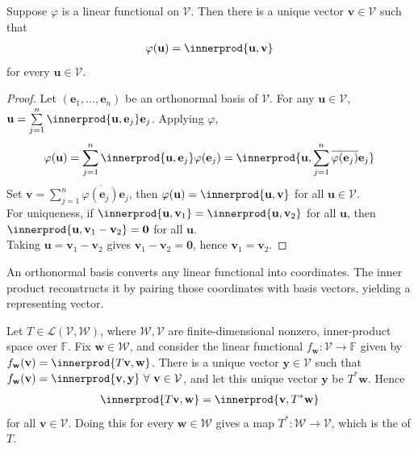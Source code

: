 \begin{theorem} Suppose $\varphi$ is a linear functional on $\mathcal{V}$. Then there is a unique vector $\mathbf{v} \in \mathcal{V}$ such that
\begin{align}
\varphi(\mathbf{u}) = \innerprod{\mathbf{u}, \mathbf{v}} \nonumber
\end{align}
for every $\mathbf{u} \in \mathcal{V}$.
\begin{proof} Let $(\mathbf{e}_1, \ldots, \mathbf{e}_n)$ be an orthonormal basis of $\mathcal{V}$. For any $\mathbf{u} \in \mathcal{V}$, $\mathbf{u} = \sum\limits_{j=1}^n \innerprod{\mathbf{u}, \mathbf{e}_j} \mathbf{e}_j$. Applying $\varphi$,
\begin{align}
\varphi(\mathbf{u}) = \sum\limits_{j=1}^n \innerprod{\mathbf{u}, \mathbf{e}_j} \varphi(\mathbf{e}_j) = \innerprod{\mathbf{u}, \sum\limits_{j=1}^n \overline{\varphi(\mathbf{e}_j)}\mathbf{e}_j} \nonumber
\end{align}
Set $\mathbf{v} = \sum\limits_{j=1}^n \overline{\varphi(\mathbf{e}_j)}\mathbf{e}_j$, then $\varphi(\mathbf{u}) = \innerprod{\mathbf{u}, \mathbf{v}}$ for all $\mathbf{u} \in \mathcal{V}$.\\
For uniqueness, if $\innerprod{\mathbf{u}, \mathbf{v}_1} = \innerprod{\mathbf{u}, \mathbf{v}_2}$ for all $\mathbf{u}$, then $\innerprod{\mathbf{u}, \mathbf{v}_1 - \mathbf{v}_2} = \mathbf{0}$ for all $\mathbf{u}$.\\
Taking $\mathbf{u} = \mathbf{v}_1 - \mathbf{v}_2$ gives $\mathbf{v}_1 - \mathbf{v}_2 = \mathbf{0}$, hence $\mathbf{v}_1 = \mathbf{v}_2$.
\end{proof}
\end{theorem}

An orthonormal basis converts any linear functional into coordinates. The inner product reconstructs it by pairing those coordinates with basis vectors, yielding a representing vector.

\begin{definition} Let $T \in \mathcal{L}(\mathcal{V}, \mathcal{W})$, where $\mathcal{W}, \mathcal{V}$ are finite-dimensional nonzero, inner-product space over $\mathbb{F}$. Fix $\mathbf{w} \in \mathcal{W}$, and consider the linear functional $f_{\mathbf{w}}: \mathcal{V} \rightarrow \mathbb{F}$ given by $f_{\mathbf{w}}(\mathbf{v}) = \innerprod{T\mathbf{v}, \mathbf{w}}$. There is a unique vector $\mathbf{y} \in \mathcal{V}$ such that $f_{\mathbf{w}}(\mathbf{v}) = \innerprod{\mathbf{v}, \mathbf{y}} \ \forall \ \mathbf{v} \in \mathcal{V}$, and let this unique vector $\mathbf{y}$ be $T^* \mathbf{w}$. Hence
\begin{align}
\innerprod{T\mathbf{v}, \mathbf{w}} = \innerprod{\mathbf{v}, T^* \mathbf{w}} \nonumber
\end{align}
for all $\mathbf{v} \in \mathcal{V}$. Doing this for every $\mathbf{w} \in \mathcal{W}$ gives a map $T^*: \mathcal{W} \rightarrow \mathcal{V}$, which is the  of $T$.
\end{definition}

